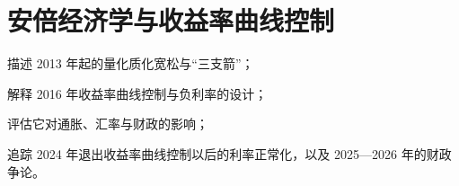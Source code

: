 \chapter{安倍经济学与收益率曲线控制}\label{ch:abenomics}

\begin{chapterguide}
\begin{guidegoals}
\item 描述 2013 年起的量化质化宽松与“三支箭”；
\item 解释 2016 年收益率曲线控制与负利率的设计；
\item 评估它对通胀、汇率与财政的影响；
\item 追踪 2024 年退出收益率曲线控制以后的利率正常化，以及 2025—2026 年的财政争论。
\end{guidegoals}
\end{chapterguide}

\chapterstub
